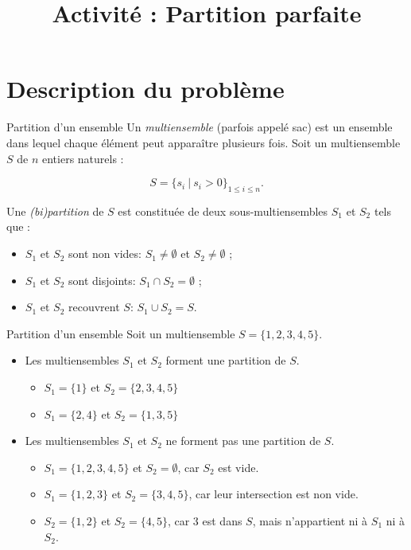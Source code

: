 \documentclass[11pt,a4paper]{article}
\title{Activité : Partition parfaite}
\date{}
\newif\ifdraftmode
\begin{document}
\newif\ifshowsols
\showsolstrue
\showsolsfalse %

\ifdraftmode
\selectcolormodel{gray}
\fi

\maketitle
\tableofcontents






\section{Description du problème}


  \begin{definition}{Partition d'un ensemble}
    Un \emph{multiensemble} (parfois appelé sac) est un ensemble dans lequel chaque élément peut apparaître plusieurs fois.
    Soit un multiensemble $S$ de $n$ entiers naturels :

    $$S = \{s_i\ |\ s_i > 0\}_{1\leq i \leq n}.$$

    Une \emph{(bi)partition} de $S$ est constituée de deux sous-multiensembles $S_1$ et $S_2$ tels que :
    \begin{itemize}
      \item $S_1$ et $S_2$ sont non vides:  $S_1 \neq \emptyset$ et $S_2 \neq \emptyset$ ;
      \item $S_1$ et $S_2$ sont disjoints:  $S_1 \cap S_2 = \emptyset$ ;
      \item $S_1$ et $S_2$ recouvrent $S$:  $S_1 \cup S_2 = S$.
    \end{itemize}
  \end{definition}

  \begin{exemple}{Partition d'un ensemble}
    Soit un multiensemble $S = \{1,2,3,4,5\}$.
    \begin{itemize}
      \item Les multiensembles $S_1$ et $S_2$ forment une partition de $S$.
        \begin{itemize}
          \item $S_1 = \{1\}$ et $S_2 = \{2,3,4,5\}$
          \item $S_1 = \{2, 4\}$ et $S_2 = \{1,3,5\}$
        \end{itemize}
      \item Les multiensembles $S_1$ et $S_2$ ne forment pas une partition de $S$.
        \begin{itemize}
          \item $S_1 = \{1,2,3,4,5\}$ et $S_2 = \emptyset$, car $S_2$ est vide.
          \item $S_1 = \{1,2,3\}$ et $S_2 = \{3,4,5\}$, car leur intersection est non vide.
          \item $S_2 = \{1,2\}$ et $S_2 = \{4, 5\}$, car 3 est dans $S$, mais n'appartient ni à $S_1$ ni à $S_2$.
        \end{itemize}
    \end{itemize}
  \end{exemple}
\end{document}
